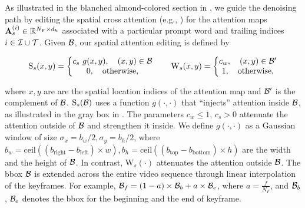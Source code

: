 As illustrated in the blanched almond-colored section in , we guide the denoising path by editing the spatial cross attention (e.g., \cite{ma2023directed}) for the attention maps $\mathbf{A}_s^{(i)} \in \mathbb{R}^{N_F \times d_h}$ associated with a particular prompt word and trailing indices $i \in \mathcal{I} \cup \mathcal{T}$. Given $\mathcal{B}$, our spatial attention editing is defined by


\begin{equation}
    \text{S}_s(x,y) =
    \left\{\begin{matrix}
        c_s\ g(x, y), \quad (x, y) \in \mathcal{B} \\
        0, \quad \text{otherwise},
    \end{matrix}\right.
    \qquad
    \text{W}_s(x,y) =
    \left\{\begin{matrix}
        c_w, \quad (x, y) \in \mathcal{B}' \\
        1, \quad \text{otherwise},
    \end{matrix}\right. 
\end{equation}

\noindent where $x, y$ are are the spatial location indices of the attention map and $\mathcal{B}'$ is the complement of $\mathcal{B}$. $\text{S}_s(\mathcal{B})$ uses a function $g(\cdot,\cdot)$ that ``injects'' attention inside $\mathcal{B}$, as illustrated in the gray box in . The parameters  $c_w \leq 1$, $c_s > 0$ attenuate the attention outside of $\mathcal{B}$ and strengthen it inside. We define $g(\cdot,\cdot)$ as a Gaussian window of size $\sigma_x = b_w/2, \sigma_y = b_h/2$, where $b_w = \text{ceil}((b_\text{right} - b_\text{left}) \times w), b_h = \text{ceil}((b_\text{top} - b_\text{bottom}) \times h)$ are the width and the height of $\mathcal{B}$. In contrast, $\text{W}_s(\cdot)$ attenuates the attention outside $\mathcal{B}$. The bbox $\mathcal{B}$ is extended across the entire video sequence through linear interpolation of the keyframes. For example, $\mathcal{B}_f = (1 - a) \times \mathcal{B}_b + a \times \mathcal{B}_e$, where $a = \frac{f}{N_F}$, and $\mathcal{B}_b$, $\mathcal{B}_e$ denotes the bbox for the beginning and the end of keyframe.

